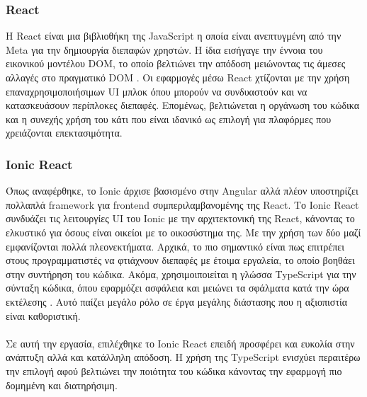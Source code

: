 \subsubsection{React}
Η React είναι μια βιβλιοθήκη της JavaScript η οποία είναι ανεπτυγμένη από την Meta για την δημιουργία διεπαφών χρηστών. Η ίδια εισήγαγε την έννοια του εικονικού μοντέλου DOM, το οποίο βελτιώνει την απόδοση μειώνοντας τις άμεσες αλλαγές στο πραγματικό DOM \parencite{React}. Οι εφαρμογές μέσω React χτίζονται με την χρήση επαναχρησιμοποιήσιμων UI μπλοκ όπου μπορούν να συνδυαστούν και να κατασκευάσουν περίπλοκες διεπαφές. Επομένως, βελτιώνεται η οργάνωση του κώδικα και η συνεχής χρήση του κάτι που είναι ιδανικό ως επιλογή για πλαφόρμες που χρειάζονται επεκτασιμότητα.

\subsubsection{Ionic React}
Όπως αναφέρθηκε, το Ionic άρχισε βασισμένο στην Angular αλλά πλέον υποστηρίζει πολλαπλά framework για frontend συμπεριλαμβανομένης της React. Το Ionic React συνδυάζει τις λειτουργίες UI του Ionic με την αρχιτεκτονική της React, κάνοντας το ελκυστικό για όσους είναι οικείοι με το οικοσύστημα της. Με την χρήση των δύο μαζί εμφανίζονται πολλά πλεονεκτήματα. Αρχικά, το πιο σημαντικό είναι πως επιτρέπει στους προγραμματιστές να φτιάχνουν διεπαφές με έτοιμα εργαλεία, το οποίο βοηθάει στην συντήρηση του κώδικα. Ακόμα, χρησιμοιποιείται η γλώσσα TypeScript για την σύνταξη κώδικα, όπου εφαρμόζει ασφάλεια και μειώνει τα σφάλματα κατά την ώρα εκτέλεσης \parencite{TypeScript}. Αυτό παίζει μεγάλο ρόλο σε έργα μεγάλης διάστασης που η αξιοπιστία είναι καθοριστική.
\\
\\
Σε αυτή την εργασία, επιλέχθηκε το Ionic React επειδή προσφέρει και ευκολία στην ανάπτυξη αλλά και κατάλληλη απόδοση. Η χρήση της TypeScript ενισχύει περαιτέρω την επιλογή αφού βελτιώνει την ποιότητα του κώδικα κάνοντας την εφαρμογή πιο δομημένη και διατηρήσιμη.

